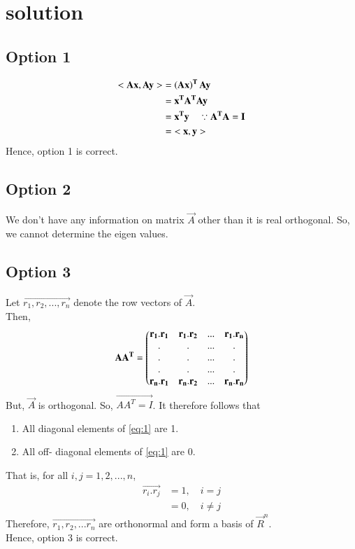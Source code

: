 \documentclass[journal,12pt,twocolumn]{IEEEtran}
\begin{document}
\section{solution}
\subsection{Option 1}
\begin{align}
    \mathbf{<Ax,Ay>}&= \mathbf{\left(Ax\right)^T Ay} \\
    &=\mathbf{ x^T A^T Ay}\\
    &= \mathbf{x^T y} \quad\because \mathbf{A^TA = I}\\
    &= \mathbf{<x,y>}
\end{align}
Hence, option 1 is correct.
\subsection{Option 2}
We don't have any information on matrix $\vec A$ other than it is real orthogonal. So, we cannot determine the eigen values.
\subsection{Option 3}
Let $\vec{r_1, r_2, ..., r_n}$ denote the row vectors of $\vec A$.\\
Then, 
\begin{align}
    \mathbf{AA^T} = \begin{pmatrix}\mathbf{r_1.r_1} & \mathbf{r_1. r_2} & ... & \mathbf{r_1.r_n}\\ . & . &... & .\\ . & . &... & .\\. & . &... & .\\ \mathbf{r_n.r_1} & \mathbf{r_n.r_2} & ... & \mathbf{r_n. r_n}\end{pmatrix} \label{eq:1}
\end{align}
But, $\vec A $ is orthogonal. So, $\vec {AA^T = I}$. It therefore follows that
\begin{enumerate}
    \item All diagonal elements of \eqref{eq:1} are 1.
    \item All off- diagonal elements of \eqref{eq:1} are 0.
\end{enumerate}
That is, for all $i, j =1, 2, ..., n $, 
\begin{align}
    \vec{r_i . r_j} &= 1 ,\quad  i=j\\
    &= 0 , \quad i\neq j
\end{align}
Therefore, $\vec{r_1, r_2, ... r_n}$ are orthonormal and form a basis of $\vec R^n$.\\
Hence, option 3 is correct.
\end{document}
